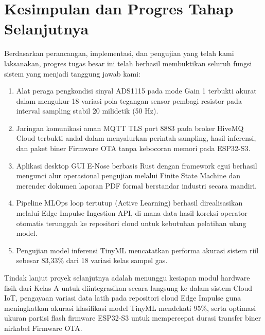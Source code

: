 \documentclass[12pt,a4paper]{article}
\begin{document}
	\section{Kesimpulan dan Progres Tahap Selanjutnya}
	Berdasarkan perancangan, implementasi, dan pengujian yang telah kami laksanakan, progres tugas besar ini telah berhasil membuktikan seluruh fungsi sistem yang menjadi tanggung jawab kami:
	\begin{enumerate}
		\item Alat peraga pengkondisi sinyal ADS1115 pada mode Gain 1 terbukti akurat dalam mengukur 18 variasi pola tegangan sensor pembagi resistor pada interval sampling stabil 20 milidetik (50 Hz).
		\item Jaringan komunikasi aman MQTT TLS port 8883 pada broker HiveMQ Cloud terbukti andal dalam menyalurkan perintah sampling, hasil inferensi, dan paket biner Firmware OTA tanpa kebocoran memori pada ESP32-S3.
		\item Aplikasi desktop GUI E-Nose berbasis Rust dengan framework egui berhasil mengunci alur operasional pengujian melalui Finite State Machine dan merender dokumen laporan PDF formal berstandar industri secara mandiri.
		\item Pipeline MLOps loop tertutup (Active Learning) berhasil direalisasikan melalui Edge Impulse Ingestion API, di mana data hasil koreksi operator otomatis terunggah ke repositori cloud untuk kebutuhan pelatihan ulang model.
		\item Pengujian model inferensi TinyML mencatatkan performa akurasi sistem riil sebesar 83,33\% dari 18 variasi kelas sampel gas.
	\end{enumerate}
	
	Tindak lanjut proyek selanjutnya adalah menunggu kesiapan modul hardware fisik dari Kelas A untuk diintegrasikan secara langsung ke dalam sistem Cloud IoT, pengayaan variasi data latih pada repositori cloud Edge Impulse guna meningkatkan akurasi klasifikasi model TinyML mendekati 95\%, serta optimasi ukuran partisi flash firmware ESP32-S3 untuk mempercepat durasi transfer biner nirkabel Firmware OTA.
	
\end{document}
